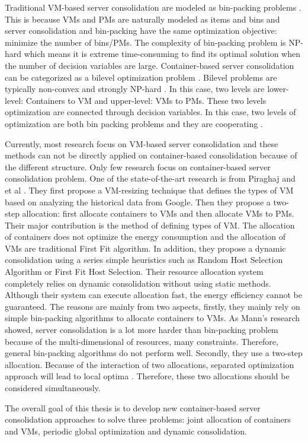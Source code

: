 Traditional VM-based server consolidation are modeled as bin-packing problems \cite{Mann:2015ua}. This is because VMs and PMs are naturally modeled as items and bins and server consolidation and bin-packing have the same optimization objective: minimize the number of bins/PMs. The complexity of bin-packing problem is NP-hard which means it is extreme time-consuming to find its optimal solution when the number of decision variables are large. Container-based server consolidation can be categorized as a bilevel optimization problem \cite{Colson:2007bu}. Bilevel problems are typically non-convex and strongly NP-hard \cite{Vicente:1994ie}. In this case, two levels are lower-level: Containers to VM and upper-level: VMs to PMs. These two levels optimization are connected through decision variables. In this case, two levels of optimization are both bin packing problems and they are cooperating \cite{Legillon:2012dd}.

Currently, most research focus on VM-based server consolidation and these methods can not be directly applied on container-based consolidation because of the different structure. Only few research focus on container-based server consolidation problem. One of the state-of-the-art research is from Piraghaj and et al \cite{Piraghaj:2015uf}. They first propose a VM-resizing technique that defines the types of VM based on analyzing the historical data from Google. Then they propose a two-step allocation: first allocate containers to VMs and then allocate VMs to PMs. Their major contribution is the method of defining types of VM. The allocation of containers does not optimize the energy consumption and the allocation of VMs are traditional First Fit algorithm. In addition, they propose a dynamic consolidation \cite{Piraghaj:2016bw} using a series simple heuristics such as Random Host Selection Algorithm or First Fit Host Selection. 
Their resource allocation system completely relies on dynamic consolidation without using static methods. Although their system can execute allocation fast, the energy efficiency cannot be guaranteed.
The reasons are mainly from two aspects, firstly, they mainly rely on simple bin-packing algorithms to allocate containers to VMs. As Mann's research \cite{Mann:2015ua} showed, server consolidation is a lot more harder than bin-packing problem because of the multi-dimensional of resources, many constraints. Therefore, general bin-packing algorithms do not perform well. Secondly, they use a two-step allocation. Because of the interaction of two allocations, separated optimization approach will lead to local optima \cite{Mann:2016hx}. Therefore, these two allocations should be considered simultaneously.

The overall goal of this thesis is to develop new container-based server consolidation approaches to solve three problems: joint allocation of containers  and VMs, periodic global optimization and dynamic consolidation. 
